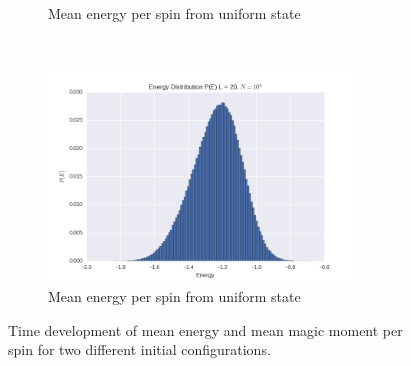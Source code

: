 \documentclass[a4paper, 10pt]{article}
\begin{document}
\begin{figure}[!ht]
\begin{subfigure}[H!]{0.5\textwidth}
        \caption{Mean energy per spin from uniform state}
   \end{subfigure}
         ~ 
  \begin{subfigure}[H!]{0.5\textwidth}
        \centering
        \includegraphics[height=2.2in]{energyDistHisto.png}
        \caption{Mean energy per spin from uniform state}
  \end{subfigure}
       \caption{Time development of mean energy and mean magic moment per spin for two different initial configurations.}
\end{figure}
\end{document}
